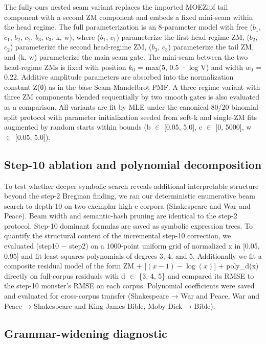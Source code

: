 \documentclass[11pt]{article}
\begin{document}
The fully-ours nested seam variant replaces the imported MOEZipf tail component with a second ZM component and embeds a fixed mini-seam within the head regime. The full parameterization is an 8-parameter model with free ($b_1$, $c_1$, $b_2$, $c_2$, $b_3$, $c_3$, k, w), where ($b_1$, $c_1$) parameterize the first head-regime ZM, ($b_2$, $c_2$) parameterize the second head-regime ZM, ($b_3$, $c_3$) parameterize the tail ZM, and (k, w) parameterize the main seam gate. The mini-seam between the two head-regime ZMs is fixed with position $k_0$ = max(5, 0.5 · log V) and width $w_0$ = 0.22. Additive amplitude parameters are absorbed into the normalization constant Z(θ) as in the base Seam-Mandelbrot PMF. A three-regime variant with three ZM components blended sequentially by two smooth gates is also evaluated as a comparison. All variants are fit by MLE under the canonical 80/20 binomial split protocol with parameter initialization seeded from soft-k and single-ZM fits augmented by random starts within bounds (b $\in$ [0.05, 5.0], c $\in$ [0, 5000], w $\in$ [0.05, 5.0]).

\subsection{Step-10 ablation and polynomial decomposition}

To test whether deeper symbolic search reveals additional interpretable structure beyond the step-2 Bregman finding, we ran our deterministic enumerative beam search to depth 10 on two exemplar high-c corpora (Shakespeare and War and Peace). Beam width and semantic-hash pruning are identical to the step-2 protocol. Step-10 dominant formulas are saved as symbolic expression trees. To quantify the structural content of the incremental step-10 correction, we evaluated (step10 − step2) on a 1000-point uniform grid of normalized x in [0.05, 0.95] and fit least-squares polynomials of degrees 3, 4, and 5. Additionally we fit a composite residual model of the form ZM + [$(x-1)-\log(x)$] + poly\_d(x) directly on full-corpus residuals with d $\in$ \{3, 4, 5\} and compared its RMSE to the step-10 monster's RMSE on each corpus. Polynomial coefficients were saved and evaluated for cross-corpus transfer (Shakespeare → War and Peace, War and Peace → Shakespeare and King James Bible, Moby Dick → Bible).

\subsection{Grammar-widening diagnostic}
\end{document}
